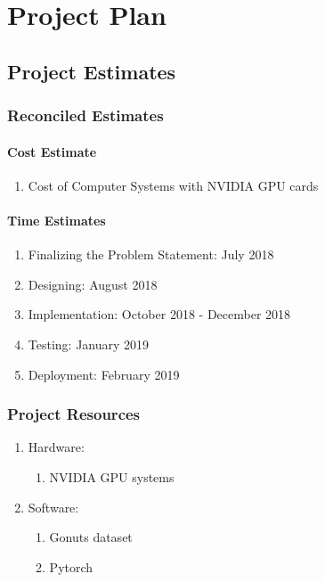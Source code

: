 \documentclass[oneside,a4paper,12pt, times]{book}
\begin{document}
\chapter{Project Plan}

\section{Project Estimates}

\subsection{Reconciled Estimates}
\subsubsection{Cost Estimate}
\begin{enumerate}
	\item Cost of Computer Systems with NVIDIA GPU cards

\end{enumerate}

\subsubsection{Time Estimates}
\begin{enumerate}
	\item Finalizing the Problem Statement: July 2018
	\item Designing: August 2018
	\item Implementation: October 2018 - December 2018
	\item Testing: January 2019
	\item Deployment: February 2019
\end{enumerate}

\subsection{Project Resources}
\begin{enumerate}
	\item Hardware:
	\begin{enumerate}
		\item NVIDIA GPU systems
		
	\end{enumerate}
	\item Software:
	\begin{enumerate}
		\item Gonuts dataset
		\item Pytorch
	\end{enumerate}
\end{enumerate}
\end{document}
